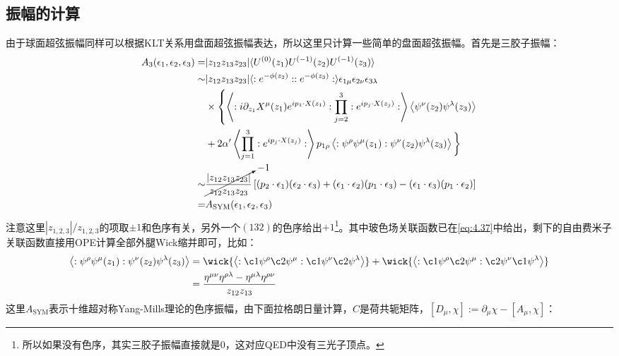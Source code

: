 \subsection{振幅的计算}
由于球面超弦振幅同样可以根据KLT关系用盘面超弦振幅表达，所以这里只计算一些简单的盘面超弦振幅。首先是三胶子振幅：
\begin{equation}
	\label{eq:4.71}
	\begin{aligned}
		A_3(\epsilon_1,\epsilon_2,\epsilon_3)=&|z_{12}z_{13}z_{23}|\langle U^{(0)}(z_1)U^{(-1)}(z_2)U^{(-1)}(z_3)\rangle\\
		\sim&|z_{12}z_{13}z_{23}|\langle:e^{-\phi(z_2)}::e^{-\phi(z_3)}:\rangle\epsilon_{1\mu}\epsilon_{2\nu}\epsilon_{3\lambda}\\
		&\times\left\{\left\langle :i\partial_{z_1}X^\mu(z_1)e^{ip_1\cdot X(z_1)}:\prod_{j=2}^3:e^{ip_j\cdot X(z_j)}: \right\rangle\left\langle\psi^\nu(z_2)\psi^\lambda(z_3)\right\rangle\right.\\
		&+2\alpha'\left\langle\prod_{j=1}^3:e^{ip_j\cdot X(z_j)}:\right\rangle p_{1\rho}\left\langle:\psi^\rho\psi^\mu(z_1):\psi^\nu(z_2)\psi^\lambda(z_3)\right\rangle\bigg\}\\
		\sim&\cancelto{-1}{\frac{|z_{12}z_{13}z_{23}|}{z_{12}z_{13}z_{23}}}\left[(p_2\cdot\epsilon_1)(\epsilon_2\cdot\epsilon_3)+(\epsilon_1\cdot\epsilon_2)(p_1\cdot\epsilon_3)-(\epsilon_1\cdot\epsilon_3)(p_1\cdot\epsilon_2)\right]\\
		=&A_{\mathrm{SYM}}(\epsilon_1,\epsilon_2,\epsilon_3)
	\end{aligned}
\end{equation}
注意这里$|z_{1,2,3}|/z_{1,2,3}$的项取$\pm1$和色序有关，另外一个$(132)$的色序给出$+1$\footnote{所以如果没有色序，其实三胶子振幅直接就是$0$，这对应QED中没有三光子顶点。}。其中玻色场关联函数已在\ref{eq:4.37}中给出，剩下的自由费米子关联函数直接用OPE计算全部外腿Wick缩并即可，比如：
\begin{equation}
\begin{aligned}
		\left\langle:\psi^\rho\psi^\mu(z_1):\psi^\nu(z_2)\psi^\lambda(z_3)\right\rangle 
	&=\wick{\left\langle:\c1\psi^\rho\c2\psi^\mu:\c1\psi^\nu\c2\psi^\lambda\right\rangle} +\wick{\left\langle:\c1\psi^\rho\c2\psi^\mu:\c2\psi^\nu\c1\psi^\lambda\right\rangle} \\
	&=\frac{\eta^{\mu\nu}\eta^{\rho\lambda}-\eta^{\mu\lambda}\eta^{\rho\nu}}{z_{12}z_{13}}
\end{aligned}
\end{equation}
这里$A_{\text{SYM}}$表示十维超对称Yang-Mills理论的色序振幅，由下面拉格朗日量计算，$C$是荷共轭矩阵，$[D_\mu,\chi]:=\partial_\mu\chi-[A_\mu,\chi]$：
